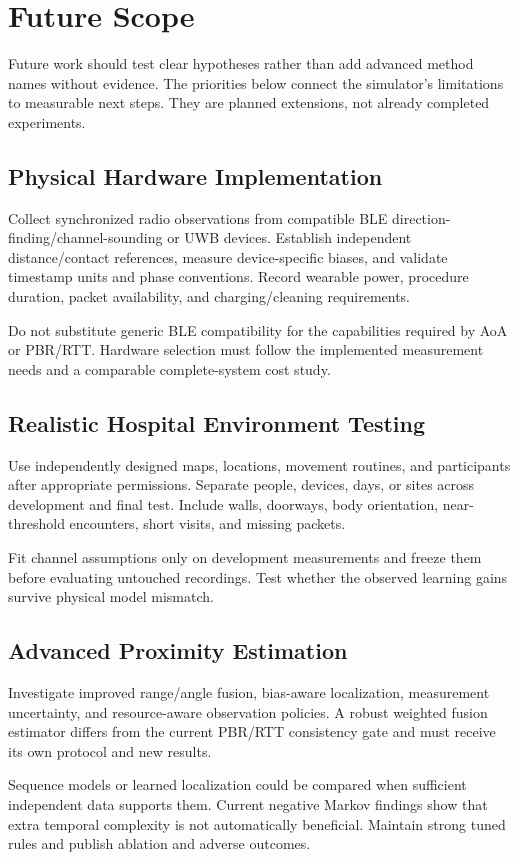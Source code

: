 \documentclass[12pt,a4paper]{report}
\begin{document}
\section{Future Scope}
Future work should test clear hypotheses rather than add advanced method names without evidence. The priorities below connect the simulator's limitations to measurable next steps. They are planned extensions, not already completed experiments.

\subsection*{Physical Hardware Implementation}
Collect synchronized radio observations from compatible BLE direction-finding/channel-sounding or UWB devices. Establish independent distance/contact references, measure device-specific biases, and validate timestamp units and phase conventions. Record wearable power, procedure duration, packet availability, and charging/cleaning requirements.

Do not substitute generic BLE compatibility for the capabilities required by AoA or PBR/RTT. Hardware selection must follow the implemented measurement needs and a comparable complete-system cost study.

\subsection*{Realistic Hospital Environment Testing}
Use independently designed maps, locations, movement routines, and participants after appropriate permissions. Separate people, devices, days, or sites across development and final test. Include walls, doorways, body orientation, near-threshold encounters, short visits, and missing packets.

Fit channel assumptions only on development measurements and freeze them before evaluating untouched recordings. Test whether the observed learning gains survive physical model mismatch.

\subsection*{Advanced Proximity Estimation}
Investigate improved range/angle fusion, bias-aware localization, measurement uncertainty, and resource-aware observation policies. A robust weighted fusion estimator differs from the current PBR/RTT consistency gate and must receive its own protocol and new results.

Sequence models or learned localization could be compared when sufficient independent data supports them. Current negative Markov findings show that extra temporal complexity is not automatically beneficial. Maintain strong tuned rules and publish ablation and adverse outcomes.
\end{document}

